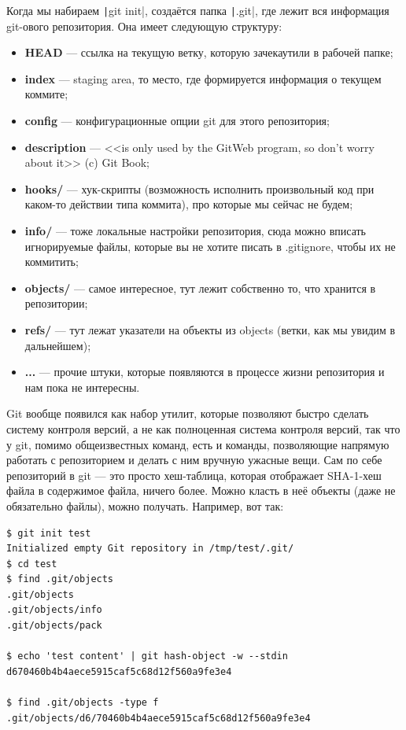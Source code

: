 \documentclass[a5paper]{article}
\begin{document}
Когда мы набираем \texttt|git init|, создаётся папка \texttt|.git|, где лежит вся информация git-ового репозитория. Она имеет следующую структуру:

\begin{itemize}
    \item \textbf{HEAD} --- ссылка на текущую ветку, которую зачекаутили в рабочей папке;
    \item \textbf{index} --- staging area, то место, где формируется информация о текущем коммите;
    \item \textbf{config} --- конфигурационные опции git для этого репозитория;
    \item \textbf{description} --- <<is only used by the GitWeb program, so don’t worry about it>> (c) Git Book;
    \item \textbf{hooks/} --- хук-скрипты (возможность исполнить произвольный код при каком-то действии типа коммита), про которые мы сейчас не будем;
    \item \textbf{info/} --- тоже локальные настройки репозитория, сюда можно вписать игнорируемые файлы, которые вы не хотите писать в .gitignore, чтобы их не коммитить;
    \item \textbf{objects/} --- самое интересное, тут лежит собственно то, что хранится в репозитории;
    \item \textbf{refs/} --- тут лежат указатели на объекты из objects (ветки, как мы увидим в дальнейшем);
    \item \textbf{...} --- прочие штуки, которые появляются в процессе жизни репозитория и нам пока не интересны.
\end{itemize}

Git вообще появился как набор утилит, которые позволяют быстро сделать систему контроля версий, а не как полноценная система контроля версий, так что у git, помимо общеизвестных команд, есть и команды, позволяющие напрямую работать с репозиторием и делать с ним вручную ужасные вещи. Сам по себе репозиторий в git --- это просто хеш-таблица, которая отображает SHA-1-хеш файла в содержимое файла, ничего более. Можно класть в неё объекты (даже не обязательно файлы), можно получать. Например, вот так:

\begin{verbatim}
$ git init test
Initialized empty Git repository in /tmp/test/.git/
$ cd test
$ find .git/objects
.git/objects
.git/objects/info
.git/objects/pack

$ echo 'test content' | git hash-object -w --stdin
d670460b4b4aece5915caf5c68d12f560a9fe3e4

$ find .git/objects -type f
.git/objects/d6/70460b4b4aece5915caf5c68d12f560a9fe3e4
\end{verbatim}
\end{document}
